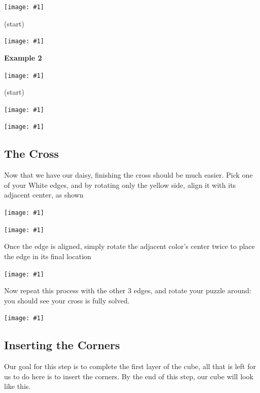\documentclass[12pt,letterpaper]{article}
\newcommand{\alg}[1]{
  \tcbox{
    {\tt #1}
  }
}
\newcommand{\pic}[1]{
  \begin{center}
	  \texttt{[image: \#1]}
  \end{center}
}
\newcommand{\npic}[2]{
  \begin{center}
	  \texttt{[image: \#1]}

	  {#2}
  \end{center}
}
\begin{document}
\begin{multicols}{2}

  \npic{daisy/edge_1}{(start)}

  \npic{daisy/daisy}{\alg{R}}
  
\end{multicols}


{\bf Example 2}

\begin{multicols}{3}

  \npic{daisy/edge_2_1}{(start)}

  \npic{daisy/edge_2_2}{\alg{U}}

  \npic{daisy/daisy}{\alg{F'}}

\end{multicols}




\subsection{The Cross}

Now that we have our daisy, finishing the cross should be much easier. Pick one
of your {\sc White} edges, and by rotating only the yellow side, align it with
its adjacent center, as shown

\begin{multicols}{2}

  \pic{cross/edge_1}

  \pic{cross/edge_2}

\end{multicols}

Once the edge is aligned, simply rotate the adjacent color's center twice to
place the edge in its final location

\pic{cross/edge_3}

Now repeat this process with the other 3 edges, and rotate your puzzle around:
you should see your cross is fully solved.

\pic{cross/final}



\subsection{Inserting the Corners \label{corner_insert}}

Our goal for this step is to complete the first layer of the cube, all that is
left for us to do here is to insert the corners. By the end of this step, our
cube will look like this.
\end{document}

